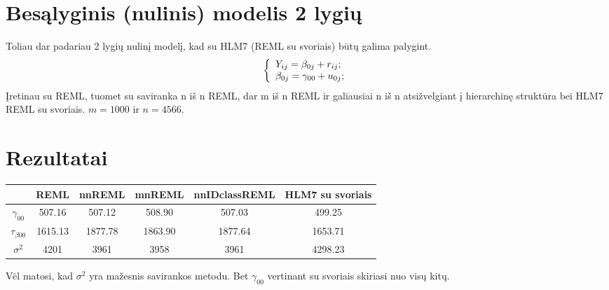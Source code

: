 \documentclass[a4paper]{article}
\begin{document}
\section{Besąlyginis (nulinis) modelis 2 lygių}
Toliau dar padariau 2 lygių nulinį modelį, kad su HLM7 (REML su svoriais) būtų galima palygint.
\[ \left\{
  \begin{array}{l l}
    Y_{ij} = \beta_{0j}+r_{ij}; \\
    \beta_{0j} = \gamma_{00} + u_{0j};
  \end{array} \right.\]
Įretinau su REML, tuomet su saviranka n iš n REML, dar m iš n REML ir galiausiai n iš n atsižvelgiant į hierarchinę struktūra bei HLM7 REML su svoriais. $m = 1000$ ir $n = 4566$.
\section{Rezultatai}

\begin{table}[ht]
\centering
\begin{tabular}{cccccc}
  \hline
 & REML & nnREML & mnREML & nnIDclassREML & HLM7 su svoriais\\ 
  \hline
$\gamma_{00}$ & 507.16 & 507.12 & 508.90 & 507.03& 499.25\\ 
  $\tau_{\beta 00}$ & 1615.13 & 1877.78 & 1863.90 & 1877.64 & 1653.71\\ 
$ \sigma^2$ & 4201 & 3961 & 3958 & 3961 & 4298.23\\ 
   \hline
\end{tabular}
\end{table}
Vėl matosi, kad $\sigma^2$ yra mažesnis savirankos metodu. Bet $\gamma_{00}$ vertinant su svoriais skiriasi nuo visų kitų.
\end{document}
